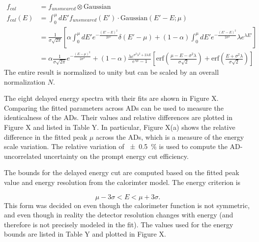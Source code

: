 \begin{align*}
    f_{cal}    &= f_{unsmeared} \otimes \text{Gaussian} \\
    f_{cal}(E) &= \int_0^\mu dE' f_{unsmeared}(E') \cdot \text{Gaussian}(E'-E; \mu) \\
               &= \frac{1}{\sigma\sqrt{2\pi}}
               \left[
                   \alpha\int_0^\mu dE' e^{-\frac{(E'-E)^2}{2\sigma^2}} \delta(E'-\mu)
                   + (1-\alpha)\int_0^\mu dE' e^{-\frac{(E'-E)^2}{2\sigma^2}}
                   \lambda e^{\lambda E'}
               \right] \\
               &= \alpha\frac{1}{\sigma\sqrt{2\pi}}e^{-\frac{(E-\mu)^2}{2\sigma^2}}
               + (1-\alpha)
               \frac{\lambda e^{\sigma^2\lambda^2+2\lambda E}}{e^{\lambda\mu}-1}
               \left[
                   \text{erf}
                   \left(
                       \frac{\mu-E-\sigma^2\lambda}{\sigma\sqrt{2}}
                   \right)
                   + \text{erf}
                   \left(
                       \frac{E + \sigma^2\lambda}{\sigma\sqrt{2}}
                   \right)
               \right]
\end{align*}
The entire result is normalized to unity
but can be scaled by an overall normalization $N$.

The eight delayed energy spectra with their fits are shown in Figure X. %
Comparing the fitted parameters across ADs can be used
to measure the identicalness of the ADs.
Their values and relative differences are plotted in Figure X %
and listed in Table Y. %
In particular, Figure X(a) shows the relative difference %
in the fitted peak $\mu$ across the ADs,
which is a measure of the energy scale variation.
The relative variation of \SI{+-0.5}{\percent}
is used to compute the AD-uncorrelated uncertainty
on the prompt energy cut efficiency.

The bounds for the delayed energy cut are computed
based on the fitted peak value and energy resolution
from the calorimter model. The energy criterion is

\begin{equation}
    \mu - 3\sigma < E < \mu + 3\sigma.
\end{equation}
This form was decided on even though the calorimeter function
is not symmetric, and even though in reality
the detector resolution changes with energy
(and therefore is not precisely modeled in the fit).
The values used for the energy bounds are listed in Table Y %
and plotted in Figure X. %

